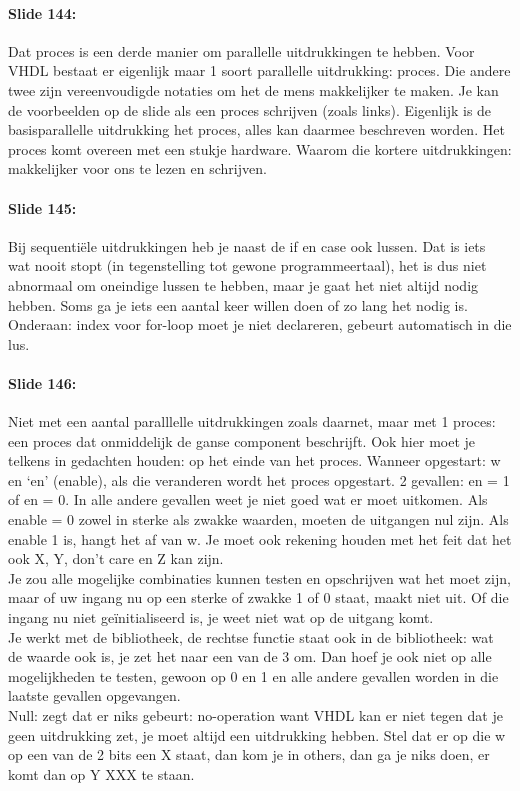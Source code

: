 \documentclass[10pt,a4paper]{book}
\begin{document}
\paragraph{Slide 144:} Dat proces is een derde manier om parallelle uitdrukkingen te hebben. Voor VHDL bestaat er eigenlijk maar 1 soort parallelle uitdrukking: proces. Die andere twee zijn vereenvoudigde notaties om het de mens makkelijker te maken. Je kan de voorbeelden op de slide als een proces schrijven (zoals links). Eigenlijk is de basisparallelle uitdrukking het proces, alles kan daarmee beschreven worden. Het proces komt overeen met een stukje hardware. Waarom die kortere uitdrukkingen: makkelijker voor ons te lezen en schrijven. 

\paragraph{Slide 145:} Bij sequenti\"ele uitdrukkingen heb je naast de if en case ook lussen. Dat is iets wat nooit stopt (in tegenstelling tot gewone programmeertaal), het is dus niet abnormaal om oneindige lussen te hebben, maar je gaat het niet altijd nodig hebben. Soms ga je iets een aantal keer willen doen of zo lang het nodig is. Onderaan: index voor for-loop moet je niet declareren, gebeurt automatisch in die lus.

\paragraph{Slide 146:} Niet met een aantal paralllelle uitdrukkingen zoals daarnet, maar met 1 proces: een proces dat onmiddelijk de ganse component beschrijft. Ook hier moet je telkens in gedachten houden: op het einde van het proces. Wanneer opgestart: w en `en' (enable), als die veranderen wordt het proces opgestart. 2 gevallen: en = 1 of en = 0. In alle andere gevallen weet je niet goed wat er moet uitkomen. Als enable = 0 zowel in sterke als zwakke waarden, moeten de uitgangen nul zijn. Als enable 1 is, hangt het af van w. Je moet ook rekening houden met het feit dat het ook X, Y, don't care en Z kan zijn.\\
Je zou alle mogelijke combinaties kunnen testen en opschrijven wat het moet zijn, maar of uw ingang nu op een sterke of zwakke 1 of 0 staat, maakt niet uit. Of die ingang nu niet ge\"initialiseerd is, je weet niet wat op de uitgang komt.\\
Je werkt met de bibliotheek, de rechtse functie staat ook in de bibliotheek: wat de waarde ook is, je zet het naar een van de 3 om. Dan hoef je ook niet op alle mogelijkheden te testen, gewoon op 0 en 1 en alle andere gevallen worden in die laatste gevallen opgevangen.\\
Null: zegt dat er niks gebeurt: no-operation want VHDL kan er niet tegen dat je geen uitdrukking zet, je moet altijd een uitdrukking hebben. Stel dat er op die w op een van de 2 bits een X staat, dan kom je in others, dan ga je niks doen, er komt dan op Y XXX te staan.
\end{document}
